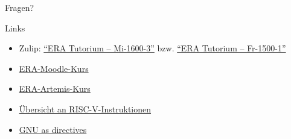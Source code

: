 \documentclass[
  german,            %
  aspectratio=169,    %
]{tumbeamer}
\begin{document}
\begin{frame}[c]{}{}
	\begin{center}
		\LARGE Fragen?
	\end{center}
\end{frame}


\begin{frame}[c, fragile]{Links}{}
	\begin{itemize}
		\item Zulip: \href{https://zulip.in.tum.de/#narrow/channel/3255-ERA-Tutorium-.E2.80.93-Mi-1600-3}{\enquote{ERA Tutorium -- Mi-1600-3}}
		      bzw. \href{https://zulip.in.tum.de/#narrow/channel/3264-ERA-Tutorium-.E2.80.93-Fr-1500-1}{\enquote{ERA Tutorium -- Fr-1500-1}}
		\item \href{https://www.moodle.tum.de/course/view.php?id=111440}{ERA-Moodle-Kurs}
		\item \href{https://artemis.in.tum.de/courses/516}{ERA-Artemis-Kurs}
		\item \href{https://msyksphinz-self.github.io/riscv-isadoc/html/index.html}{Übersicht an RISC-V-Instruktionen}
		\item \href{https://ftp.gnu.org/old-gnu/Manuals/gas/html_chapter/as_7.html}{GNU as directives}
	\end{itemize}
\end{frame}

\maketitle
\end{document}
